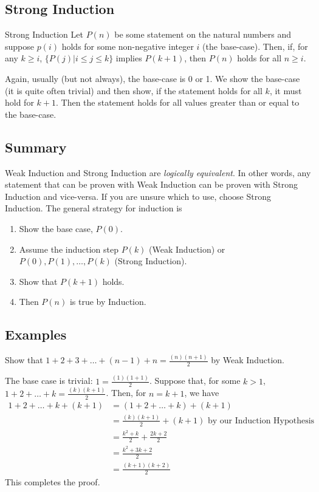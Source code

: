 \subsection{Strong Induction}
\begin{definition}{Strong Induction}{}
    Let $P(n)$ be some statement on the natural numbers and suppose $p(i)$ holds for some non-negative integer $i$ (the base-case). Then, if, for any $k\geq i$, $\{P(j)|i\leq j\leq k\}$ implies $P(k+1)$, then $P(n)$ holds for all $n\geq i$.
\end{definition}

Again, usually (but not always), the base-case is 0 or 1. We show the base-case (it is quite often trivial) and then show, if the statement holds for all $k$, it must hold for $k+1$. Then the statement holds for all values greater than or equal to the base-case.

\subsection{Summary}
Weak Induction and Strong Induction are \textit{logically equivalent}. In other words, any statement that can be proven with Weak Induction can be proven with Strong Induction and vice-versa. If you are unsure which to use, choose Strong Induction. The general strategy for induction is
\begin{enumerate}
    \item Show the base case, $P(0)$.
    \item Assume the induction step $P(k)$ (Weak Induction) or $P(0), P(1), \hdots, P(k)$ (Strong Induction).
    \item Show that $P(k+1)$ holds.
    \item Then $P(n)$ is true by Induction.
\end{enumerate}

\subsection{Examples}
\begin{exercise}{}{}
    Show that $1+2+3+\hdots+(n-1)+n=\frac{(n)(n+1)}{2}$ by Weak Induction.
\end{exercise}
\begin{solution}
    The base case is trivial: $1=\frac{(1)(1+1)}{2}$. Suppose that, for some $k>1$, $1+2+\hdots+k=\frac{(k)(k+1)}{2}$. Then, for $n=k+1$, we have
    \begin{align*}1+2+\hdots+k+(k+1) & =(1+2+\hdots+k) + (k+1)                                      \\
                           & =\frac{(k)(k+1)}{2}+(k+1)\text{ by our Induction Hypothesis} \\
                           & =\frac{k^2+k}{2}+\frac{2k+2}{2}                              \\&=\frac{k^2+3k+2}{2}\\&=\frac{(k+1)(k+2)}{2}
    \end{align*}
    This completes the proof.
\end{solution}

